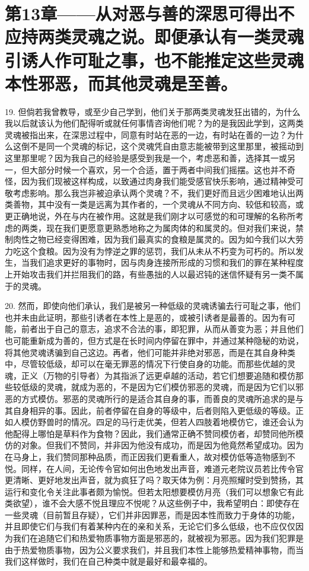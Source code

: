 \section{第13章——从对恶与善的深思可得出不应持两类灵魂之说。即便承认有一类灵魂引诱人作可耻之事，也不能推定这些灵魂本性邪恶，而其他灵魂是至善。}

19. 但倘若我曾教导，或至少自己学到，他们关于那两类灵魂发狂出错的，为什么我以后就该认为他们配得听或就任何事情咨询他们呢？为的是我因此学到，这两类灵魂被指出来，在深思过程中，同意有时站在恶的一边，有时站在善的一边？为什么这倒不是同一个灵魂的标记，这个灵魂凭自由意志能被带到这里那里，被摇动到这里那里呢？因为我自己的经验是感受到我是一个，考虑恶和善，选择其一或另一，但大部分时候一个喜欢，另一个合适，置于两者中间我们摇摆。这也并不奇怪，因为我们现被这样构成，以致通过肉身我们能受感官快乐影响，通过精神受可敬考虑影响。那么我岂非被迫承认两个灵魂？不，我们更好而且远少困难地认出两类善物，其中没有一类是远离为其作者的，一个灵魂从不同方向、较低和较高，或更正确地说，外在与内在被作用。这就是我们刚才以可感觉的和可理解的名称所考虑的两类，现在我们更愿意更熟悉地称之为属肉体的和属灵的。但对我们来说，禁制肉性之物已经变得困难，因为我们最真实的食粮是属灵的。因为如今我们以大劳力吃这个食粮。因为没有为悖逆之罪的惩罚，我们从未从不朽变为可朽的。所以发生，当我们追求更好的事物时，因与肉身连接所形成的习惯和我们的罪在某种程度上开始攻击我们并拦阻我们的路，有些愚拙的人以最迟钝的迷信怀疑有另一类不属于的灵魂。\par

20. 然而，即使向他们承认，我们是被另一种低级的灵魂诱骗去行可耻之事，他们也并未由此证明，那些引诱者在本性上是恶的，或被引诱者是最善的。因为有可能，前者出于自己的意志，追求不合法的事，即犯罪，从而从善变为恶；并且他们也可能重新成为善的，但方式是在长时间内停留在罪中，并通过某种隐秘的劝说，将其他灵魂诱骗到自己这边。再者，他们可能并非绝对邪恶，而是在其自身种类中，尽管较低级，却可以在毫无罪恶的情况下行使自身的功能。而那些优越的灵魂，正义（万物的引导者）为其指派了远更卓越的活动，若它们想要追随和模仿那些较低级的灵魂，就成为恶的，不是因为它们模仿邪恶的灵魂，而是因为它们以邪恶的方式模仿。邪恶的灵魂所行的是适合其自身的事，而善良的灵魂所追求的是与其自身相异的事。因此，前者停留在自身的等级中，后者则陷入更低级的等级。正如人模仿野兽时的情况。四足的马行走优美，但若人四肢着地模仿它，谁还会认为他配得上哪怕是草料作为食物？因此，我们通常正确不赞同模仿者，却赞同他所模仿的对象。但我们不赞同，并非因为他没有成功，而是因为他竟然希望成功。因为在马身上，我们赞同那种品质，而正因我们更看重人，故对模仿低等造物感到不悦。同样，在人间，无论传令官如何出色地发出声音，难道元老院议员若比传令官更清晰、更好地发出声音，就为疯狂了吗？取天体为例：月亮照耀时受到赞扬，其运行和变化令关注此事者颇为愉悦。但若太阳想要模仿月亮（我们可以想象它有此类欲望），谁不会大感不悦且理应不悦呢？从这些例子中，我希望明白：即使存在一些灵魂（目前暂且存疑），它们并非因罪恶，而是因本性而致力于身体的功能，并且即使它们与我们有着某种内在的亲和关系，无论它们多么低级，也不应仅仅因为我们在追随它们和热爱物质事物方面是邪恶的，就被视为邪恶。因为我们犯罪是由于热爱物质事物，因为公义要求我们，并且我们本性上能够热爱精神事物，而当我们这样做时，我们在自己种类中就是最好和最幸福的。\par

